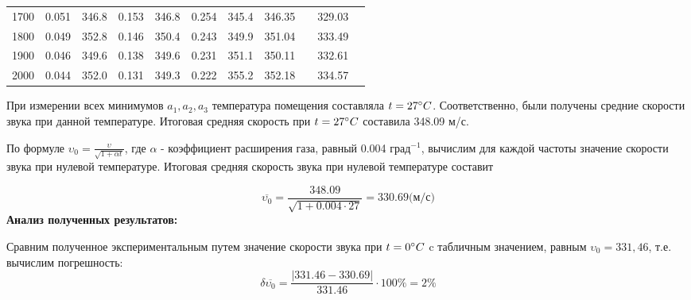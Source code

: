 \documentclass[12pt]{article}
\newcommand\field[1]{\noindent\textbf{#1}\ }
\begin{document}
\begin{center}
\begin{tabular}{|l|l|l|l|l|l|l|l|c|l|c|}
        1700            & 0.051  & 346.8     & 0.153  & 346.8    & 0.254  & 345.4    & 346.35            &                          & 329.03          &                                                 \\ \cline{1-8} \cline{10-10}
        1800            & 0.049  & 352.8     & 0.146  & 350.4    & 0.243  & 349.9    & 351.04            &                          & 333.49          &                                                 \\ \cline{1-8} \cline{10-10}
        1900            & 0.046  & 349.6     & 0.138  & 349.6    & 0.231  & 351.1    & 350.11            &                          & 332.61          &                                                 \\ \cline{1-8} \cline{10-10}
        2000            & 0.044  & 352.0     & 0.131  & 349.3    & 0.222  & 355.2    & 352.18            &                          & 334.57          &                                                 \\ \hline
        \end{tabular}
\end{center}

При измерении всех минимумов $a_1, a_2, a_3$ температура помещения составляла $t = 27 \degree C$. Соответственно, были получены средние скорости звука при данной температуре. Итоговая средняя скорость при $t = 27 \degree C$ составила 348.09 м/с. \par

По формуле $\upsilon_0 = \frac{\upsilon
}{\sqrt{1 + \alpha t}}$, где $\alpha$ - коэффициент расширения газа, равный 0.004 $\text{град}^{-1}$, вычислим для каждой частоты значение скорости звука при нулевой температуре. \newline
\newline \newline
Итоговая средняя скорость звука при нулевой температуре составит 

\begin{equation}
    \overline{\upsilon_0} = \frac{348.09}{\sqrt{1 +  0.004\cdot27}} = 330.69  \text{(м/с)}
\end{equation}
\newline
\field{Анализ полученных результатов:}

Сравним полученное экспериментальным путем значение скорости звука при $t = 0 \degree C$ c табличным значением, равным $\upsilon_0 = 331,46$, т.е. вычислим погрешность:
\begin{equation}
    \delta\overline{\upsilon_0} = \frac{|331.46-330.69|}{331.46} \cdot 100\% = 2 \%
\end{equation}
\end{document}
